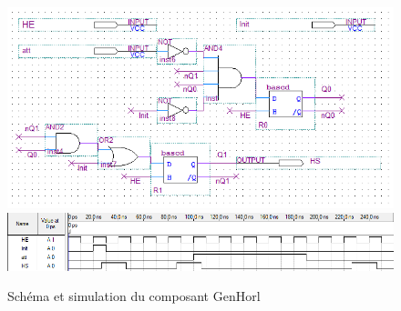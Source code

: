 \documentclass[a4paper,11pt]{article}
\begin{document}
\begin{figure}[h]
\center
\includegraphics[scale=0.6]{GenHorl.png}\vspace*{1em}
\includegraphics[scale=0.6]{sim.png}
\caption{Schéma et simulation du composant GenHorl}
\label{genhorl}
\end{figure}
\end{document}
